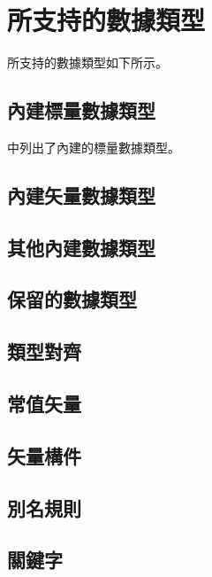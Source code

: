 \section{所支持的數據類型}

所支持的數據類型如下所示。

\subsection{內建標量數據類型}

中列出了內建的標量數據類型。


\subsection{內建矢量數據類型}

\subsection{其他內建數據類型}

\subsection{保留的數據類型}

\subsection{類型對齊}

\subsection{常值矢量}

\subsection{矢量構件}

\subsection{別名規則}

\subsection{關鍵字}

